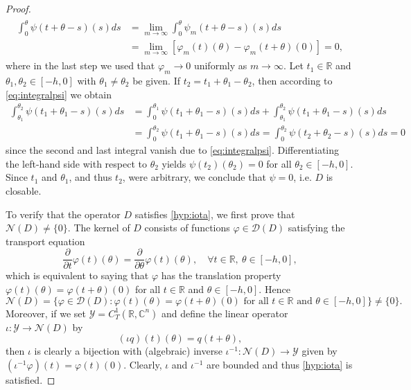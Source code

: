 \documentclass[english]{myarticle}
\begin{document}
\begin{sloppypar}
\begin{proof}
\begin{align}
    \begin{split} \label{eq:integralpsi}
    \int_0^\theta  \psi(t+\theta-s)(s) ds &= \lim_{m \to \infty} \int_0^\theta  \psi_m(t+\theta-s)(s) ds \\
    &= \lim_{m \to \infty} [\varphi_m(t)(\theta) - \varphi_m(t+\theta)(0)] = 0,
    \end{split}
\end{align}
where in the last step we used that $\varphi_m \to 0$ uniformly as $m \to \infty$. Let $t_1 \in \mathbb{R}$ and $\theta_1,\theta_2 \in [-h,0]$ with $\theta_1 \neq \theta_2$ be given. If $t_2 = t_1 + \theta_1 - \theta_2$, then according to \eqref{eq:integralpsi} we obtain
\begin{align*}
    \int_{\theta_1}^{\theta_2} \psi(t_1+\theta_1-s)(s) ds &= \int_{0}^{\theta_1} \psi(t_1+\theta_1-s)(s) ds + \int_{\theta_1}^{\theta_2} \psi(t_1+\theta_1-s)(s) ds \\
    &= \int_{0}^{\theta_2} \psi(t_1+\theta_1-s)(s) ds = \int_{0}^{\theta_2} \psi(t_2+\theta_2-s)(s) ds = 0
\end{align*}
since the second and last integral vanish due to \eqref{eq:integralpsi}. Differentiating the left-hand side with respect to $\theta_2$ yields $\psi(t_2)(\theta_2) = 0$ for all $\theta_2 \in [-h,0]$. Since $t_1$ and $\theta_1$, and thus $t_2$, were arbitrary, we conclude that $\psi = 0$, i.e. $D$ is closable.

To verify that the operator $D$ satisfies \ref{hyp:iota}, we first prove that $\mathcal{N} (D) \neq  \{0\}$. The kernel of $D$ consists of functions $\varphi \in \mathcal{D}(D)$ satisfying the transport equation
\begin{equation*}
    \frac{\partial}{\partial t} \varphi(t)(\theta) = \frac{\partial}{\partial \theta} \varphi(t)(\theta), \quad \forall t \in \mathbb{R}, \ \theta \in [-h,0],
\end{equation*}
which is equivalent to saying that $\varphi$ has the translation property $\varphi(t)(\theta) = \varphi(t+\theta)(0)$ for all $t \in \mathbb{R}$ and $\theta \in [-h,0]$. Hence 
\begin{equation*}
\mathcal{N} (D) = \{ \varphi \in \mathcal{D}(D) : \varphi(t)(\theta) = \varphi(t+\theta)(0) \mbox{ for all }  t \in \mathbb{R} \mbox{ and } \theta \in [-h, 0]\}  \neq \{0\}.
\end{equation*}
Moreover, if we set $\mathcal{Y} = C_T^1(\mathbb{R},\mathbb{C}^n)$
and define the linear operator $\iota : \mathcal{Y} \to \mathcal{N}(D)$ by
\begin{equation} \label{eq:iotaDDE}
    (\iota q)(t)(\theta) = q(t+\theta),
\end{equation}
then $\iota$ is clearly a bijection with (algebraic) inverse $\iota^{-1} : \mathcal{N}(D) \to \mathcal{Y}$ given by $(\iota^{-1}\varphi)(t) = \varphi(t)(0)$. Clearly, $\iota$ and $\iota^{-1}$ are bounded and thus \ref{hyp:iota} is satisfied.


\end{proof}
\end{sloppypar}
\end{document}

